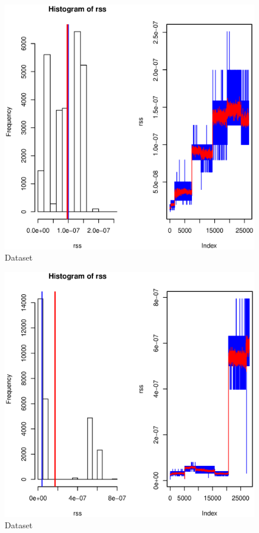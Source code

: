 \documentclass [12 pt , a4paper ] {article}
\begin{document}
\begin{figure}[!ht]
  \centering
  \includegraphics[scale=0.2]{link-35-channel-64.eps}
  \caption{Dataset}
  \label{fig:Dataset}
\end{figure}
\begin{figure}[!ht]
  \centering
  \includegraphics[scale=0.2]{link-35-channel-165.eps}
  \caption{Dataset}
  \label{fig:Dataset}
\end{figure}
\end{document}
